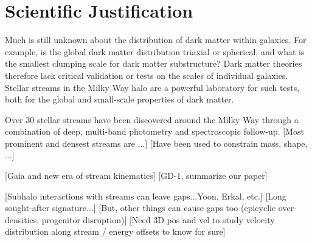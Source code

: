 \documentclass[12pt]{article}
\begin{document}
%
%
\section*{Scientific Justification}\vskip-0.2in


Much is still unknown about the distribution of dark matter within galaxies.
For example, is the global dark matter distribution triaxial or spherical, and what is the smallest clumping scale for dark matter substructure?
Dark matter theories therefore lack critical validation or tests on the scales of individual galaxies.
Stellar streams in the Milky Way halo are a powerful laboratory for such tests, both for the global and small-scale properties of dark matter.

Over 30 stellar streams have been discovered around the Milky Way through a combination of deep, multi-band photometry and spectroscopic follow-up.
[Most prominent and densest streams are ...]
[Have been used to constrain mass, shape, ...]

[Gaia and new era of stream kinematics]
[GD-1, summarize our paper]

[Subhalo interactions with streams can leave gaps...Yoon, Erkal, etc.]
[Long sought-after signature...]
[But, other things can cause gaps too (epicyclic over-densities, progenitor disruption)]
[Need 3D pos and vel to study velocity distribution along stream / energy offsets to know for sure]
\end{document}
